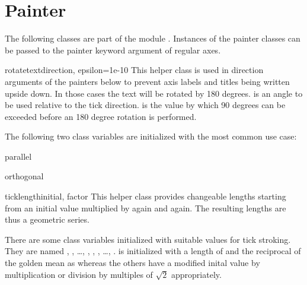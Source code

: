 \section{Painter}


The following classes are part of the module
. Instances of the painter classes can be
passed to the painter keyword argument of regular axes.

\begin{classdesc}{rotatetext}{direction, epsilon=1e-10}
  This helper class is used in direction arguments of the painters
  below to prevent axis labels and titles being written upside down.
  In those cases the text will be rotated by 180 degrees.
   is an angle to be used relative to the tick
  direction.  is the value by which 90 degrees can be
  exceeded before an 180 degree rotation is performed.
\end{classdesc}

The following two class variables are initialized with the most common
use case:

\begin{memberdesc}{parallel}
\end{memberdesc}

\begin{memberdesc}{orthogonal}
\end{memberdesc}

\begin{classdesc}{ticklength}{initial, factor}
  This helper class provides changeable \PyX{} lengths starting from
  an initial value  multiplied by  again and
  again. The resulting lengths are thus a geometric series.
\end{classdesc}

There are some class variables initialized with suitable values for
tick stroking. They are named ,
, \dots, ,
, , \dots,
.  is initialized with
a length of  and the reciprocal of the golden mean as
 whereas the others have a modified inital value by
multiplication or division by multiples of $\sqrt{2}$ appropriately.

